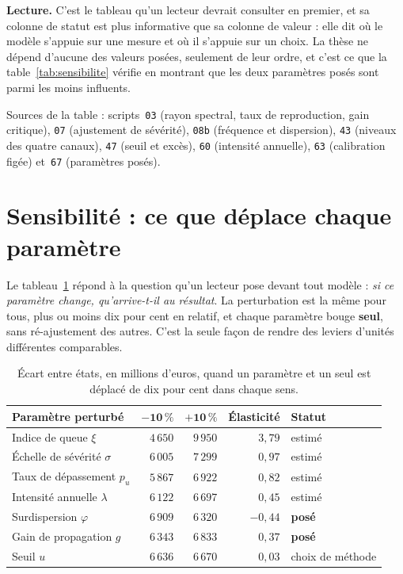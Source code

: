\documentclass[12pt,a4paper]{article}
\theoremstyle{definition}
\begin{document}
\textbf{Lecture.} C'est le tableau qu'un lecteur devrait consulter en premier, et
sa colonne de statut est plus informative que sa colonne de valeur : elle dit où le
modèle s'appuie sur une mesure et où il s'appuie sur un choix. La thèse ne dépend
d'aucune des valeurs posées, seulement de leur ordre, et c'est ce que la
table~\ref{tab:sensibilite} vérifie en montrant que les deux paramètres posés sont
parmi les moins influents.

\vspace{4pt}
\noindent Sources de la table : scripts~\texttt{03} (rayon spectral, taux de
reproduction, gain critique), \texttt{07} (ajustement de sévérité), \texttt{08b}
(fréquence et dispersion), \texttt{43} (niveaux des quatre canaux), \texttt{47}
(seuil et excès), \texttt{60} (intensité annuelle), \texttt{63} (calibration
figée) et~\texttt{67} (paramètres posés).

\section{Sensibilité : ce que déplace chaque paramètre}
\label{ann:sensibilite}

Le tableau~\ref{tab:balayage} répond à la question qu'un lecteur pose devant tout
modèle : \emph{si ce paramètre change, qu'arrive-t-il au résultat}. La perturbation
est la même pour tous, plus ou moins dix pour cent en relatif, et chaque paramètre
bouge \textbf{seul}, sans ré-ajustement des autres. C'est la seule façon de rendre
des leviers d'unités différentes comparables.

\begin{table}[htbp]
\centering\small
\renewcommand{\arraystretch}{1.2}
\begin{tabular}{@{}>{\raggedright\arraybackslash}p{5.2cm}rrrl@{}}
\toprule
\textbf{Paramètre perturbé} & $\boldsymbol{-10\,\%}$ & $\boldsymbol{+10\,\%}$ &
\textbf{Élasticité} & \textbf{Statut} \\
\midrule
Indice de queue $\xi$            & $4\,650$ & $9\,950$ & $3{,}79$ & estimé \\
Échelle de sévérité $\sigma$     & $6\,005$ & $7\,299$ & $0{,}97$ & estimé \\
Taux de dépassement $p_u$        & $5\,867$ & $6\,922$ & $0{,}82$ & estimé \\
Intensité annuelle $\lambda$     & $6\,122$ & $6\,697$ & $0{,}45$ & estimé \\
Surdispersion $\varphi$          & $6\,909$ & $6\,320$ & $-0{,}44$ & \textbf{posé} \\
Gain de propagation $g$          & $6\,343$ & $6\,833$ & $0{,}37$ & \textbf{posé} \\
Seuil $u$                        & $6\,636$ & $6\,670$ & $0{,}03$ & choix de méthode \\
\bottomrule
\end{tabular}
\caption{Écart entre états, en millions d'euros, quand un paramètre et un seul est
déplacé de dix pour cent dans chaque sens.}
\label{tab:balayage}
\end{table}
\end{document}

